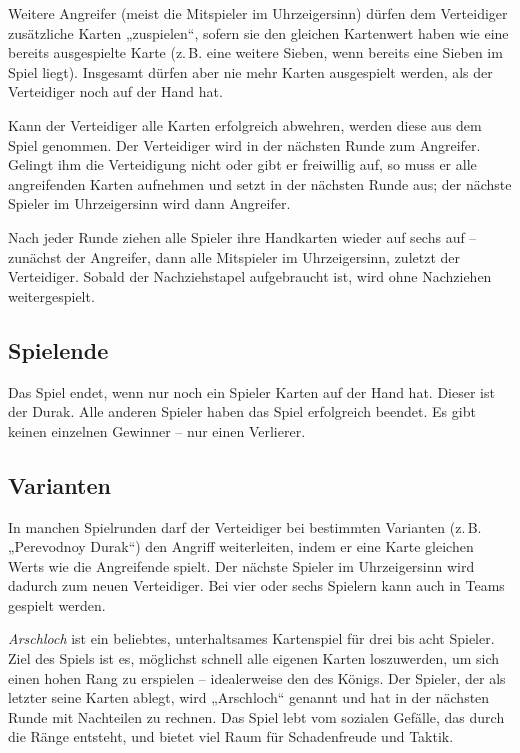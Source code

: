 Weitere Angreifer (meist die Mitspieler im Uhrzeigersinn) dürfen dem Verteidiger zusätzliche Karten „zuspielen“, sofern sie den gleichen Kartenwert haben wie eine bereits ausgespielte Karte (z.\,B. eine weitere Sieben, wenn bereits eine Sieben im Spiel liegt). Insgesamt dürfen aber nie mehr Karten ausgespielt werden, als der Verteidiger noch auf der Hand hat.

Kann der Verteidiger alle Karten erfolgreich abwehren, werden diese aus dem Spiel genommen. Der Verteidiger wird in der nächsten Runde zum Angreifer. Gelingt ihm die Verteidigung nicht oder gibt er freiwillig auf, so muss er alle angreifenden Karten aufnehmen und setzt in der nächsten Runde aus; der nächste Spieler im Uhrzeigersinn wird dann Angreifer.

Nach jeder Runde ziehen alle Spieler ihre Handkarten wieder auf sechs auf – zunächst der Angreifer, dann alle Mitspieler im Uhrzeigersinn, zuletzt der Verteidiger. Sobald der Nachziehstapel aufgebraucht ist, wird ohne Nachziehen weitergespielt.

\subsection*{Spielende}

Das Spiel endet, wenn nur noch ein Spieler Karten auf der Hand hat. Dieser ist der Durak. Alle anderen Spieler haben das Spiel erfolgreich beendet. Es gibt keinen einzelnen Gewinner – nur einen Verlierer.

\subsection*{Varianten}

In manchen Spielrunden darf der Verteidiger bei bestimmten Varianten (z.\,B. „Perevodnoy Durak“) den Angriff weiterleiten, indem er eine Karte gleichen Werts wie die Angreifende spielt. Der nächste Spieler im Uhrzeigersinn wird dadurch zum neuen Verteidiger. Bei vier oder sechs Spielern kann auch in Teams gespielt werden.



\textit{Arschloch} ist ein beliebtes, unterhaltsames Kartenspiel für drei bis acht Spieler. Ziel des Spiels ist es, möglichst schnell alle eigenen Karten loszuwerden, um sich einen hohen Rang zu erspielen – idealerweise den des Königs. Der Spieler, der als letzter seine Karten ablegt, wird „Arschloch“ genannt und hat in der nächsten Runde mit Nachteilen zu rechnen. Das Spiel lebt vom sozialen Gefälle, das durch die Ränge entsteht, und bietet viel Raum für Schadenfreude und Taktik.

